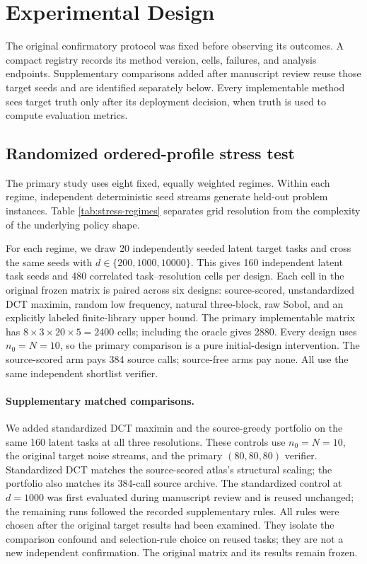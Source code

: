 \section{Experimental Design}\label{sec:experiments}

The original confirmatory protocol was fixed before observing its outcomes.
A compact registry records its method version, cells, failures, and analysis
endpoints.  Supplementary comparisons added after manuscript review reuse
those target seeds and are identified separately below.  Every implementable
method sees target truth only after its deployment decision, when truth is
used to compute evaluation metrics.

\subsection{Randomized ordered-profile stress test}

The primary study uses eight fixed, equally weighted regimes.  Within each
regime, independent deterministic seed streams generate held-out problem
instances.  Table \ref{tab:stress-regimes} separates grid resolution from the
complexity of the underlying policy shape.


For each regime, we draw 20 independently seeded latent target tasks and cross
the same seeds with $d\in\{200,1000,10000\}$.  This gives 160 independent
latent task seeds and 480 correlated task--resolution cells per design.  Each
cell in the original frozen matrix is paired across six designs: source-scored,
unstandardized DCT
maximin, random low frequency, natural three-block, raw Sobol, and an
explicitly labeled finite-library upper bound.  The primary implementable
matrix has
$8\times3\times20\times5=2400$ cells; including the oracle gives 2880.  Every
design uses $n_0=N=10$, so the primary comparison is a pure initial-design
intervention.  The source-scored arm pays 384 source calls; source-free arms
pay none.  All use the same independent shortlist verifier.

\paragraph{Supplementary matched comparisons.}\label{sec:supplemental-controls}
We added standardized DCT maximin and the source-greedy portfolio on the same
160 latent tasks at all three resolutions.  These controls use $n_0=N=10$,
the original target noise streams, and the primary $(80,80,80)$ verifier.
Standardized DCT matches the source-scored atlas's structural scaling; the
portfolio also matches its 384-call source archive.  The standardized control
at $d=1000$ was first evaluated during manuscript review and is reused
unchanged; the remaining runs followed the recorded supplementary rules.
All rules were chosen after the original target results had been examined.
They isolate the comparison confound and
selection-rule choice on reused tasks; they are not a new independent
confirmation.  The original matrix and its results remain frozen.


